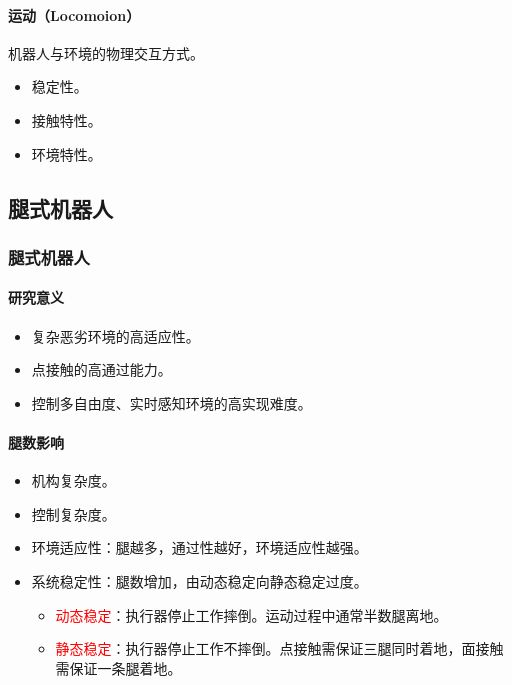 \documentclass[
12pt, %
a4paper, 
oneside, %
]{scrartcl}
\begin{document}
\paragraph{运动（Locomoion）}
机器人与环境的物理交互方式。
\begin{itemize}
\item 稳定性。
\item 接触特性。
\item 环境特性。
\end{itemize}
\subsection[腿式机器人]{腿式机器人}
\subsubsection[腿式机器人]{腿式机器人}
\paragraph{研究意义}
\begin{itemize}
\item 复杂恶劣环境的高适应性。
\item 点接触的高通过能力。
\item 控制多自由度、实时感知环境的高实现难度。
\end{itemize}
\paragraph{腿数影响}
\begin{itemize}
\item 机构复杂度。
\item 控制复杂度。
\item 环境适应性：腿越多，通过性越好，环境适应性越强。
\item 系统稳定性：腿数增加，由动态稳定向静态稳定过度。
\begin{itemize}
\item \textcolor{red}{动态稳定}：执行器停止工作摔倒。运动过程中通常半数腿离地。
\item \textcolor{red}{静态稳定}：执行器停止工作不摔倒。点接触需保证三腿同时着地，面接触需保证一条腿着地。
\end{itemize}
\end{itemize}
\end{document}
